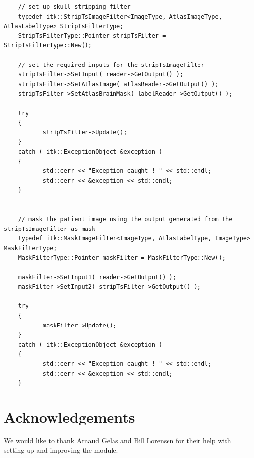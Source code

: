 \documentclass{InsightArticle}
\begin{document}
\small
\begin{verbatim}
	// set up skull-stripping filter
	typedef itk::StripTsImageFilter<ImageType, AtlasImageType, AtlasLabelType> StripTsFilterType;
	StripTsFilterType::Pointer stripTsFilter = StripTsFilterType::New();

	// set the required inputs for the stripTsImageFilter
	stripTsFilter->SetInput( reader->GetOutput() );
	stripTsFilter->SetAtlasImage( atlasReader->GetOutput() );
	stripTsFilter->SetAtlasBrainMask( labelReader->GetOutput() );

	try
	{
		   stripTsFilter->Update();
	}
	catch ( itk::ExceptionObject &exception )
	{
		   std::cerr << "Exception caught ! " << std::endl;
		   std::cerr << &exception << std::endl;
	}


	// mask the patient image using the output generated from the stripTsImageFilter as mask
	typedef itk::MaskImageFilter<ImageType, AtlasLabelType, ImageType> MaskFilterType;
	MaskFilterType::Pointer maskFilter = MaskFilterType::New();

	maskFilter->SetInput1( reader->GetOutput() );
	maskFilter->SetInput2( stripTsFilter->GetOutput() );

	try
	{
		   maskFilter->Update();
	}
	catch ( itk::ExceptionObject &exception )
	{
		   std::cerr << "Exception caught ! " << std::endl;
		   std::cerr << &exception << std::endl;
	}
\end{verbatim}
\normalsize

\section{Acknowledgements}
We would like to thank Arnaud Gelas and Bill Lorensen for their help with setting up and improving the module.

\newpage


%
%



\end{document}
